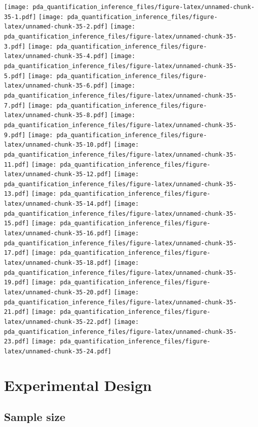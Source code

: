 \documentclass[
]{article}
\begin{document}
\texttt{[image: pda\_quantification\_inference\_files/figure-latex/unnamed-chunk-35-1.pdf]}
\texttt{[image: pda\_quantification\_inference\_files/figure-latex/unnamed-chunk-35-2.pdf]}
\texttt{[image: pda\_quantification\_inference\_files/figure-latex/unnamed-chunk-35-3.pdf]}
\texttt{[image: pda\_quantification\_inference\_files/figure-latex/unnamed-chunk-35-4.pdf]}
\texttt{[image: pda\_quantification\_inference\_files/figure-latex/unnamed-chunk-35-5.pdf]}
\texttt{[image: pda\_quantification\_inference\_files/figure-latex/unnamed-chunk-35-6.pdf]}
\texttt{[image: pda\_quantification\_inference\_files/figure-latex/unnamed-chunk-35-7.pdf]}
\texttt{[image: pda\_quantification\_inference\_files/figure-latex/unnamed-chunk-35-8.pdf]}
\texttt{[image: pda\_quantification\_inference\_files/figure-latex/unnamed-chunk-35-9.pdf]}
\texttt{[image: pda\_quantification\_inference\_files/figure-latex/unnamed-chunk-35-10.pdf]}
\texttt{[image: pda\_quantification\_inference\_files/figure-latex/unnamed-chunk-35-11.pdf]}
\texttt{[image: pda\_quantification\_inference\_files/figure-latex/unnamed-chunk-35-12.pdf]}
\texttt{[image: pda\_quantification\_inference\_files/figure-latex/unnamed-chunk-35-13.pdf]}
\texttt{[image: pda\_quantification\_inference\_files/figure-latex/unnamed-chunk-35-14.pdf]}
\texttt{[image: pda\_quantification\_inference\_files/figure-latex/unnamed-chunk-35-15.pdf]}
\texttt{[image: pda\_quantification\_inference\_files/figure-latex/unnamed-chunk-35-16.pdf]}
\texttt{[image: pda\_quantification\_inference\_files/figure-latex/unnamed-chunk-35-17.pdf]}
\texttt{[image: pda\_quantification\_inference\_files/figure-latex/unnamed-chunk-35-18.pdf]}
\texttt{[image: pda\_quantification\_inference\_files/figure-latex/unnamed-chunk-35-19.pdf]}
\texttt{[image: pda\_quantification\_inference\_files/figure-latex/unnamed-chunk-35-20.pdf]}
\texttt{[image: pda\_quantification\_inference\_files/figure-latex/unnamed-chunk-35-21.pdf]}
\texttt{[image: pda\_quantification\_inference\_files/figure-latex/unnamed-chunk-35-22.pdf]}
\texttt{[image: pda\_quantification\_inference\_files/figure-latex/unnamed-chunk-35-23.pdf]}
\texttt{[image: pda\_quantification\_inference\_files/figure-latex/unnamed-chunk-35-24.pdf]}

\hypertarget{experimental-design}{%
\section{Experimental Design}\label{experimental-design}}

\hypertarget{sample-size}{%
\subsection{Sample size}\label{sample-size}}
\end{document}
